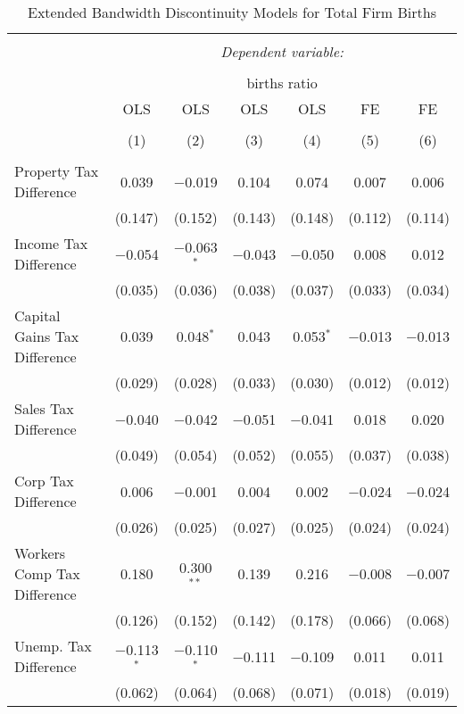 
\begin{table}[!htbp] \centering 
  \caption{Extended Bandwidth Discontinuity Models for  Total Firm Births} 
  \label{--rd} 
\begin{tabular}{@{\extracolsep{5pt}}lcccccc} 
\\[-1.8ex]\hline 
\hline \\[-1.8ex] 
 & \multicolumn{6}{c}{\textit{Dependent variable:}} \\ 
\cline{2-7} 
\\[-1.8ex] & \multicolumn{6}{c}{births ratio} \\ 
 & OLS & OLS & OLS & OLS & FE & FE \\ 
\\[-1.8ex] & (1) & (2) & (3) & (4) & (5) & (6)\\ 
\hline \\[-1.8ex] 
 Property Tax Difference & 0.039 & $-$0.019 & 0.104 & 0.074 & 0.007 & 0.006 \\ 
  & (0.147) & (0.152) & (0.143) & (0.148) & (0.112) & (0.114) \\ 
  Income Tax Difference & $-$0.054 & $-$0.063$^{*}$ & $-$0.043 & $-$0.050 & 0.008 & 0.012 \\ 
  & (0.035) & (0.036) & (0.038) & (0.037) & (0.033) & (0.034) \\ 
  Capital Gains Tax Difference & 0.039 & 0.048$^{*}$ & 0.043 & 0.053$^{*}$ & $-$0.013 & $-$0.013 \\ 
  & (0.029) & (0.028) & (0.033) & (0.030) & (0.012) & (0.012) \\ 
  Sales Tax Difference & $-$0.040 & $-$0.042 & $-$0.051 & $-$0.041 & 0.018 & 0.020 \\ 
  & (0.049) & (0.054) & (0.052) & (0.055) & (0.037) & (0.038) \\ 
  Corp Tax Difference & 0.006 & $-$0.001 & 0.004 & 0.002 & $-$0.024 & $-$0.024 \\ 
  & (0.026) & (0.025) & (0.027) & (0.025) & (0.024) & (0.024) \\ 
  Workers Comp Tax Difference & 0.180 & 0.300$^{**}$ & 0.139 & 0.216 & $-$0.008 & $-$0.007 \\ 
  & (0.126) & (0.152) & (0.142) & (0.178) & (0.066) & (0.068) \\ 
  Unemp. Tax Difference & $-$0.113$^{*}$ & $-$0.110$^{*}$ & $-$0.111 & $-$0.109 & 0.011 & 0.011 \\ 
  & (0.062) & (0.064) & (0.068) & (0.071) & (0.018) & (0.019) \\ 

\end{tabular}
\end{table}
